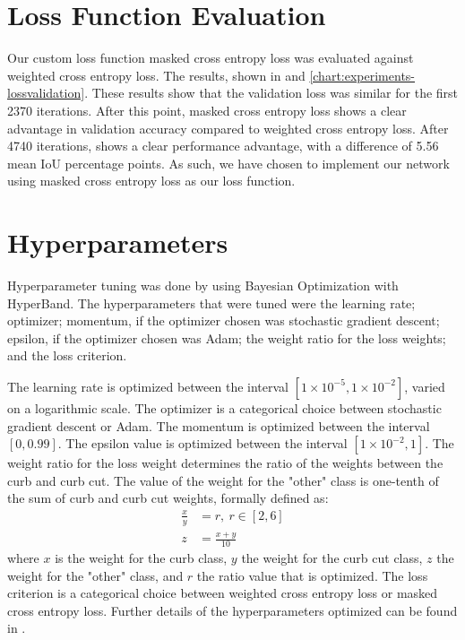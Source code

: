 
\section{Loss Function Evaluation}\label{section:experiments-loss}
Our custom loss function masked cross entropy loss was evaluated against weighted cross entropy loss.
The results, shown in  and \ref{chart:experiments-lossvalidation}.
These results show that the validation loss was similar for the first 2370 iterations.
After this point, masked cross entropy loss shows a clear advantage in validation accuracy compared to weighted cross entropy loss.
After 4740 iterations, shows a clear performance advantage, with a difference of 5.56 mean IoU percentage points.
As such, we have chosen to implement our network using masked cross entropy loss as our loss function.



\section{Hyperparameters} \label{section:experiments-hyperparameters}
Hyperparameter tuning was done by using Bayesian Optimization with HyperBand.
The hyperparameters that were tuned were the learning rate; optimizer; momentum, if the optimizer chosen was stochastic gradient descent; epsilon, if the optimizer chosen was Adam; the weight ratio for the loss weights; and the loss criterion.

The learning rate is optimized between the interval $\left[1 \times 10^{-5}, 1 \times 10^{-2}\right]$, varied on a logarithmic scale.
The optimizer is a categorical choice between stochastic gradient descent or Adam.
The momentum is optimized between the interval $\left[0, 0.99\right]$.
The epsilon value is optimized between the interval $\left[1 \times 10^{-2}, 1\right]$.
The weight ratio for the loss weight determines the ratio of the weights between the curb and curb cut.
The value of the weight for the "other" class is one-tenth of the sum of curb and curb cut weights, formally defined as:
\begin{equation}
	\begin{split}
		\frac{x}{y} &= r, ~r \in \left[2, 6\right]\\
		z &= \frac{x + y}{10}
	\end{split}
\end{equation}
where $x$ is the weight for the curb class, $y$ the weight for the curb cut class, $z$ the weight for the "other" class, and $r$ the ratio value that is optimized.
The loss criterion is a categorical choice between weighted cross entropy loss or masked cross entropy loss.
Further details of the hyperparameters optimized can be found in .


